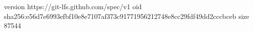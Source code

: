 version https://git-lfs.github.com/spec/v1
oid sha256:e56d7e6993efbf10e8e7107af373c91771956212748e8cc29fdf49dd2cccbceb
size 87544
